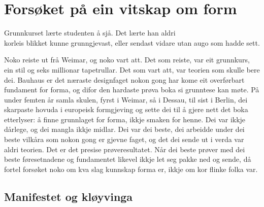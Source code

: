 \chapter{Forsøket på ein vitskap om form}

\begin{motto}
Grunnkurset lærte studenten å sjå. Det lærte han aldri\\ korleis blikket kunne grunngjevast, eller sendast vidare utan augo som hadde sett.
\end{motto}

Noko reiste ut frå Weimar, og noko vart att. Det som reiste, var eit grunnkurs, ein stil og seks millionar tapetrullar. Det som vart att, var teorien som skulle bere dei. Bauhaus er det næraste designfaget nokon gong har kome eit overførbart fundament for forma, og difor den hardaste prøva boka si grunntese kan møte. På under femten år samla skulen, fyrst i Weimar, så i Dessau, til sist i Berlin, dei skarpaste hovuda i europeisk formgjeving og sette dei til å gjere nett det boka etterlyser: å finne grunnlaget for forma, ikkje smaken for henne. Dei var ikkje dårlege, og dei mangla ikkje midlar. Dei var dei beste, dei arbeidde under dei beste vilkåra som nokon gong er gjevne faget, og det dei sende ut i verda var aldri teorien. Det er det presise prøveresultatet. Når dei beste prøver med dei beste føresetnadene og fundamentet likevel ikkje let seg pakke ned og sende, då fortel forsøket noko om kva slag kunnskap forma er, ikkje om kor flinke folka var.



\section{Manifestet og kløyvinga}

